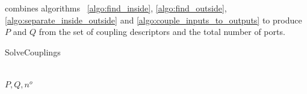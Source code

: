  combines algorithms~%
\ref{algo:find_inside},
\ref{algo:find_outside},
\ref{algo:separate_inside_outside} and
\ref{algo:couple_inputs_to_outputs}
to produce $P$ and $Q$ from the set of coupling descriptors and the total number of ports.
\begin{algorithm}
    \caption{SolveCouplings}
    \label{algo:solve_couplings}
    \begin{algorithmic}
         
         
         
        \\ \Return $P, Q, n^o$
        \EndFunction
    \end{algorithmic}
\end{algorithm}

